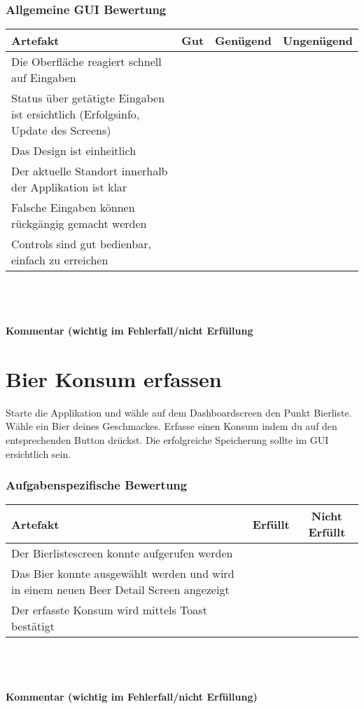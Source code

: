 \documentclass[10pt,a4paper]{scrartcl}
\begin{document}
\subsubsection*{Allgemeine GUI Bewertung}
\begin{tabular}{|l|c|c|c|}
\hline 
\rule[-1ex]{0pt}{2.5ex} \textbf{Artefakt} & \textbf{Gut} & \textbf{Genügend} & \textbf{Ungenügend} \\ 
\hline 
\rule[-1ex]{0pt}{2.5ex} Die Oberfläche reagiert schnell auf Eingaben &  &  &  \\ 
\hline 
\rule[-1ex]{0pt}{2.5ex} Status über getätigte Eingaben ist ersichtlich (Erfolgsinfo, Update des Screens) &  &  &  \\ 
\hline 
\rule[-1ex]{0pt}{2.5ex} Das Design ist einheitlich &  &  &  \\ 
\hline 
\rule[-1ex]{0pt}{2.5ex} Der aktuelle Standort innerhalb der Applikation ist klar &  &  &  \\ 
\hline 
\rule[-1ex]{0pt}{2.5ex} Falsche Eingaben können rückgängig gemacht werden &  &  &  \\ 
\hline 
\rule[-1ex]{0pt}{2.5ex} Controls sind gut bedienbar, einfach zu erreichen &  &  &  \\  
\hline 
\end{tabular} 
\\
\\
\\
\textbf{Kommentar (wichtig im Fehlerfall/nicht Erfüllung}
\vspace*{8cm}

\section{Bier Konsum erfassen}
Starte die Applikation und wähle auf dem Dashboardscreen den Punkt Bierliste. Wähle ein Bier deines Geschmackes. Erfasse einen Konsum indem du auf den entsprechenden Button drückst. Die erfolgreiche Speicherung sollte im GUI ersichtlich sein.

\subsubsection*{Aufgabenspezifische Bewertung}
\begin{tabular}{|l|c|c|}
\hline 
\textbf{Artefakt} & \textbf{Erfüllt} & \textbf{Nicht Erfüllt} \\ 
\hline 
Der Bierlistescreen konnte aufgerufen werden &  &  \\ 
\hline 
Das Bier konnte ausgewählt werden und wird in einem neuen Beer Detail Screen angezeigt &  &  \\ 
\hline 
Der erfasste Konsum wird mittels Toast bestätigt &  &  \\ 
\hline 
\end{tabular}
\\
\\
\\
\textbf{Kommentar (wichtig im Fehlerfall/nicht Erfüllung)}
\vspace*{8cm}
\end{document}
